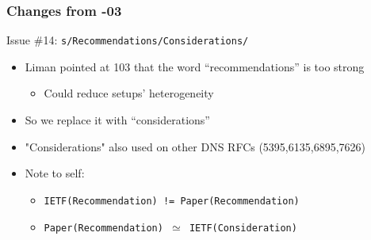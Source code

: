 \documentclass[11pt,show 
notes,notheorems,noamsthm,blank]{beamer} %
\begin{document}
\begin{frame}
\frametitle{Changes from -03}
\begin{block}{ Issue \#14: \texttt{s/Recommendations/Considerations/}}
\begin{itemize}
 \item Liman pointed at 103 that the word ``recommendations'' is too strong
 \begin{itemize}

 \item Could reduce  setups' heterogeneity 
 \end{itemize}
 \item So we replace it with ``considerations''
 \item "Considerations" also used on other DNS RFCs (5395,6135,6895,7626)

  \item Note to self: 
  \begin{itemize}
   \item \texttt{IETF(Recommendation) != Paper(Recommendation)} 
   \item \texttt{Paper(Recommendation) $\simeq$ IETF(Consideration)}
 
  \end{itemize}

\end{itemize}

 
\end{block}



\end{frame}
\end{document}
